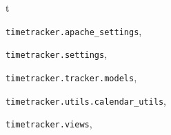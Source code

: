 \documentclass[letterpaper,10pt,english]{sphinxmanual}
\begin{document}
\renewcommand{\indexname}{Python Module Index}
\begin{theindex}
\def\bigletter#1{{\Large\sffamily#1}\nopagebreak\vspace{1mm}}
\bigletter{t}
\item {\texttt{timetracker.apache\_settings}}, \pageref{code:module-timetracker.apache_settings}
\item {\texttt{timetracker.settings}}, \pageref{code:module-timetracker.settings}
\item {\texttt{timetracker.tracker.models}}, \pageref{code:module-timetracker.tracker.models}
\item {\texttt{timetracker.utils.calendar\_utils}}, \pageref{code:module-timetracker.utils.calendar_utils}
\item {\texttt{timetracker.views}}, \pageref{code:module-timetracker.views}
\end{theindex}

\renewcommand{\indexname}{Index}
\printindex
\end{document}
